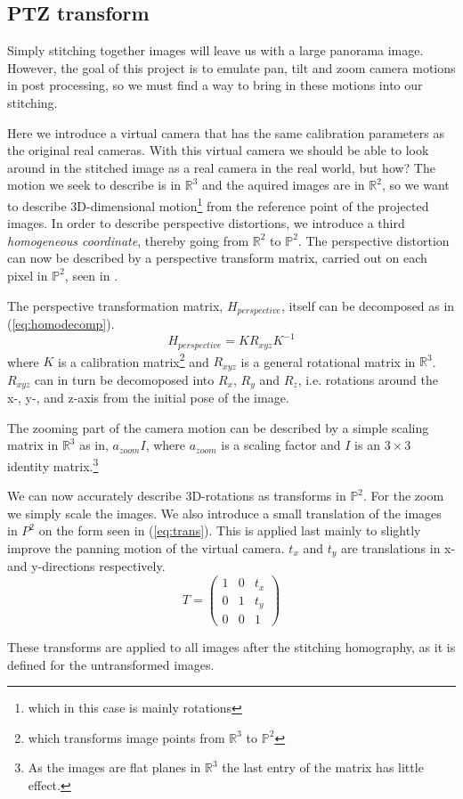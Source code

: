 \subsection{PTZ transform}
	Simply stitching together images will leave us with a large panorama image.
        However, the goal of this project is to emulate pan, tilt and zoom camera motions in post processing, so we must find a way to bring in these motions into our stitching.

	Here we introduce a virtual camera that has the same calibration parameters as the original real cameras.
	With this virtual camera we should be able to look around in the stitched image as a real camera in the real world, but how?
	The motion we seek to describe is in $\mathbb{R}^3$ and the aquired images are in $\mathbb{R}^2$, so we want to describe 3D-dimensional motion\footnote{which in this case is mainly rotations} from the reference point of the projected images.
	In order to describe perspective distortions, we introduce a third \emph{homogeneous coordinate}, thereby going from $\mathbb{R}^2$ to $\mathbb{P}^2$.
	The perspective distortion can now be described by a perspective transform matrix, carried out on each pixel in $\mathbb{P}^2$, seen in \cite{hartley2003Multiple}.

	The perspective transformation matrix, $H_{perspective}$, itself can be decomposed as in (\ref{eq:homodecomp}).
	\begin{equation}
		H_{perspective}=KR_{xyz}K^{-1}
		\label{eq:homodecomp}
	\end{equation}
	where $K$ is a calibration matrix\footnote{which transforms image points from $\mathbb{R}^3$ to $\mathbb{P}^2$} and $R_{xyz}$ is a general rotational matrix in $\mathbb{R}^3$.
$R_{xyz}$ can in turn be decomoposed into $R_x$, $R_y$ and $R_z$, i.e. rotations around the x-, y-, and z-axis from the initial pose of the image.

	The zooming part of the camera motion can be described by a simple scaling matrix in $\mathbb{R}^3$ as in, $a_{zoom}I$, where $a_{zoom}$ is a scaling factor and $I$ is an $3 \times 3$ identity matrix.\footnote{As the images are flat planes in $\mathbb{R}^3$ the last entry of the matrix has little effect.}

	We can now accurately describe 3D-rotations as transforms in $\mathbb{P}^2$.
        For the zoom we simply scale the images.
	We also introduce a small translation of the images in $P^2$ on the form seen in (\ref{eq:trans}).
	This is applied last mainly to slightly improve the panning motion of the virtual camera.
	$t_x$ and $t_y$ are translations in x- and y-directions respectively.
\begin{equation}
	T=\begin{pmatrix}
		1 & 0 & t_x \\
		0 & 1 & t_y \\
		0 & 0 & 1
	\end{pmatrix}
	\label{eq:trans}
\end{equation}

These transforms are applied to all images after the stitching homography, as it is defined for the untransformed images.
